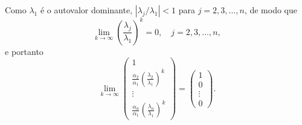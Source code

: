 \begin{exenumerate}
\begin{solution}
        Como $\lambda_1$ \'e o autovalor dominante, $|\lambda_j/\lambda_1| < 1$ para $j = 2, 3, \ldots, n$, de modo que
        \begin{equation}
            \lim_{k \rightarrow \infty} \left(\frac{\lambda_j}{\lambda_1} \right)^k = 0, \quad j=2, 3, \ldots, n,
        \end{equation}
        e portanto
        \begin{equation}
            \lim_{k\to \infty}
            \begin{pmatrix}
                1 \\
                \frac{\alpha_2}{\alpha_1}\left(\frac{\lambda_2}{\lambda_1}\right)^k \\
                \vdots \\
                \frac{\alpha_n}{\alpha_1}\left(\frac{\lambda_n}{\lambda_1}\right)^k 
            \end{pmatrix}
            = \begin{pmatrix}
                1 \\
                0\\
                \vdots\\
                0
            \end{pmatrix}.
        \end{equation}
        

\end{solution}
\end{exenumerate}
